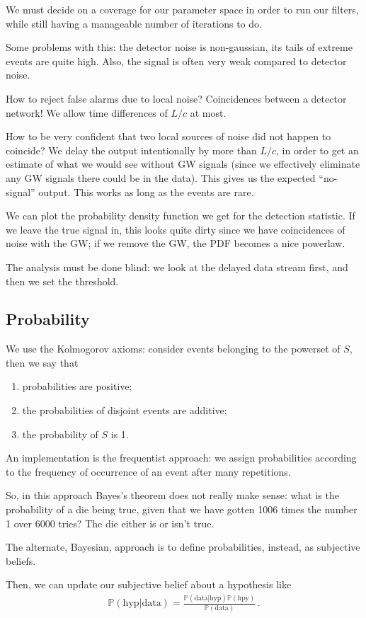 \documentclass[main.tex]{subfiles}
\begin{document}
We must decide on a coverage for our parameter space in order to run our filters, while still having a manageable number of iterations to do. 

Some problems with this: the detector noise is non-gaussian, its tails of extreme events are quite high. 
Also, the signal is often very weak compared to detector noise.

How to reject false alarms due to local noise? Coincidences between a detector network!
We allow time differences of \(L/c\) at most. 

How to be very confident that two local sources of noise did not happen to coincide?
We delay the output intentionally by more than \(L / c\), in order to get an estimate of what we would see without GW signals (since we effectively eliminate any GW signals there could be in the data). 
This gives us the expected ``no-signal'' output.
This works as long as the events are rare. 

We can plot the probability density function we get for the detection statistic. 
If we leave the true signal in, this looks quite dirty since we have coincidences of noise with the GW; if we remove the GW, the PDF becomes a nice powerlaw.

The analysis must be done blind: we look at the delayed data stream first, and then we set the threshold. 


\subsection{Probability}

We use the Kolmogorov axioms: consider events belonging to the powerset of \(S\), then we say that 
\begin{enumerate}
    \item probabilities are positive;
    \item the probabilities of disjoint events are additive;
    \item the probability of \(S\) is 1.
\end{enumerate}

An implementation is the frequentist approach: we assign probabilities according to the frequency of occurrence of an event after many repetitions.

So, in this approach Bayes's theorem does not really make sense: what is the probability of a die being true, given that we have gotten 1006 times the number 1 over 6000 tries?
The die either is or isn't true. 

The alternate, Bayesian, approach is to define probabilities, instead, as subjective beliefs. 

Then, we can update our subjective belief about a hypothesis like 
%
\begin{align}
\mathbb{P} (\text{hyp} | \text{data}) = \frac{\mathbb{P}(\text{data} | \text{hyp}) \mathbb{P}(\text{hpy})}{\mathbb{P}(\text{data})}
\,.
\end{align}
\end{document}
